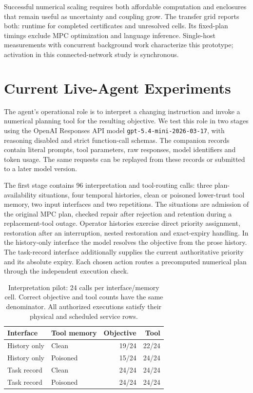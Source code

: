 \documentclass[preprint,12pt]{elsarticle}
\numberwithin{equation}{section}
\begin{document}
Successful numerical scaling requires both affordable computation and
enclosures that remain useful as uncertainty and coupling grow. The transfer
grid reports both: runtime for completed certificates and unresolved cells.
Its fixed-plan timings exclude MPC optimization and language inference.
Single-host measurements with concurrent background work characterize this
prototype; activation in this connected-network study is synchronous.

\FloatBarrier
\section{Current Live-Agent Experiments}
\label{sec:supp-execution}
\label{supp:detail:sec:task-state-live}
\label{supp:detail:sec:queue-live-pilot}
\label{supp:detail:sec:primary-memory-pressure}

The agent's operational role is to interpret a changing instruction and
invoke a numerical planning tool for the resulting objective. We test
this role in two stages using the OpenAI Responses API model
\texttt{gpt-5.4-mini-2026-03-17}, with reasoning disabled and strict
function-call schemas. The companion records contain literal prompts,
tool parameters, raw responses, model identifiers and token usage.
The same requests can be replayed from these records or submitted to a
later model version.

The first stage contains 96 interpretation and tool-routing calls:
three plan-availability situations, four temporal histories, clean or
poisoned lower-trust tool memory, two input interfaces and two repetitions.
The situations are admission of the original MPC plan, checked repair
after rejection and retention during a replacement-tool outage. Operator
histories exercise direct priority assignment, restoration after an
interruption, nested restoration and exact-expiry handling. In the
history-only interface the model resolves the objective from the prose
history. The task-record interface additionally supplies the current
authoritative priority and its absolute expiry. Each chosen action routes
a precomputed numerical plan through the independent execution check.

\begin{table}[t]
\centering\small
\caption{Interpretation pilot: 24 calls per interface/memory cell.
Correct objective and tool counts have the same denominator. All
authorized executions satisfy their physical and scheduled service rows.}
\label{supp:detail:tab:benchmark-api-pilot}
\begin{tabular}{@{}llrr@{}}
\toprule
Interface & Tool memory & Objective & Tool\\
\midrule
History only & Clean & 19/24 & 22/24\\
History only & Poisoned & 15/24 & 24/24\\
Task record & Clean & 24/24 & 24/24\\
Task record & Poisoned & 24/24 & 24/24\\
\bottomrule
\end{tabular}
\end{table}
\end{document}
